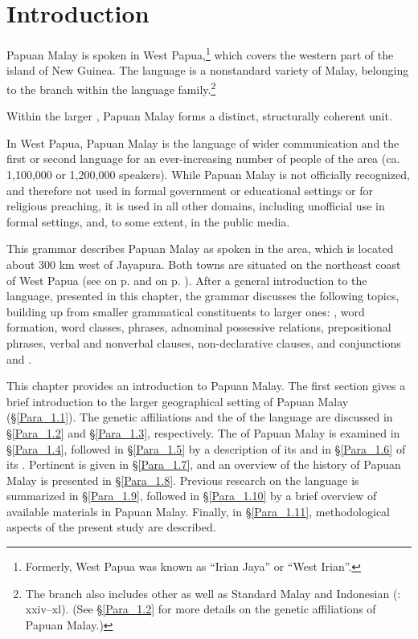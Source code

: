 \chapter[Introduction]{Introduction}\label{Para_1}

Papuan Malay is spoken in West Papua,\footnote{Formerly, West Papua was known as  ``Irian Jaya'' or  ``West Irian''.} which covers the western part of the island of New Guinea. The language is a nonstandard variety of Malay, belonging to the  branch within the  language family.\footnote{The  branch also includes other  as well as Standard Malay and Indonesian {(\citealt{Blust.2013}: xxiv–xl)}. (See §\ref{Para_1.2} for more details on the genetic affiliations of Papuan Malay.)}

Within the larger , Papuan Malay forms a distinct, structurally coherent unit.

In West Papua, Papuan Malay is the language of wider communication and the first or second language for an ever-increasing number of people of the area (ca. 1,100,000 or 1,200,000 speakers). While Papuan Malay is not officially recognized, and therefore not used in formal government or educational settings or for religious preaching, it is used in all other domains, including unofficial use in formal settings, and, to some extent, in the public media.

This grammar describes Papuan Malay as spoken in the  area, which is located about 300 km west of Jayapura. Both towns are situated on the northeast coast of West Papua (see  on p. \pageref{Figure_0.1} and  on p. \pageref{Figure_0.2}). After a general introduction to the language, presented in this chapter, the grammar discusses the following topics, building up from smaller grammatical constituents to larger ones: , word formation, word classes,  phrases, adnominal possessive relations, prepositional phrases, verbal and nonverbal clauses, non-declarative clauses, and conjunctions and .

This chapter provides an introduction to Papuan Malay. The first section gives a brief introduction to the larger geographical setting of Papuan Malay (§\ref{Para_1.1}). The genetic affiliations and the  of the language are discussed in §\ref{Para_1.2} and §\ref{Para_1.3}, respectively. The  of Papuan Malay is examined in §\ref{Para_1.4}, followed in §\ref{Para_1.5} by a description of its  and in §\ref{Para_1.6} of its . Pertinent  is given in §\ref{Para_1.7}, and an overview of the history of Papuan Malay is presented in §\ref{Para_1.8}. Previous research on the language is summarized in §\ref{Para_1.9}, followed in §\ref{Para_1.10} by a brief overview of available materials in Papuan Malay. Finally, in §\ref{Para_1.11}, methodological aspects of the present study are described.


